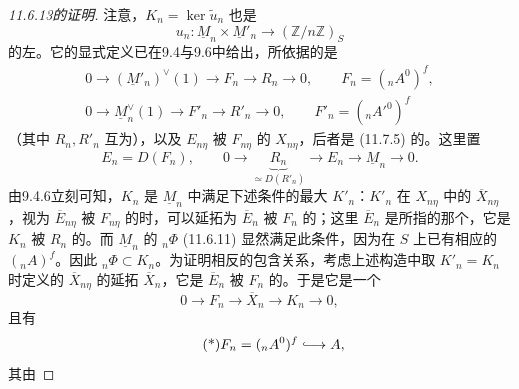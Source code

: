 \begin{proof}[11.6.13的证明]
注意，$K_n=\ker\widetilde u_n$ 也是
\[
 u_n:\underline M_n\times\underline M'_n\longrightarrow(\mathbb Z/n\mathbb Z)_S
\]
的左。它的显式定义已在9.4与9.6中给出，所依据的是
\begin{equation}\tag{11.6.14}
 \begin{gathered}
 0\longrightarrow(\underline M'_n)^\vee(1)\longrightarrow F_n
 \longrightarrow R_n\longrightarrow0,\qquad F_n=({}_nA^0)^f,\\
 0\longrightarrow\underline M_n^\vee(1)\longrightarrow F'_n
 \longrightarrow R'_n\longrightarrow0,\qquad F'_n=({}_nA'^0)^f
 \end{gathered}
\end{equation}
（其中 $R_n,R'_n$ 互为），以及 $E_{n\eta}$ 被 $F_{n\eta}$ 的 $X_{n\eta}$，后者是 (11.7.5) 的。这里置
\begin{equation}\tag{11.6.15}
 E_n=D(F_n),\qquad
 0\longrightarrow\underbrace{R_n}_{\simeq D(R'_n)}\longrightarrow E_n
 \longrightarrow\underline M_n\longrightarrow0.
\end{equation}
由9.4.6立刻可知，$K_n$ 是 $\underline M_n$ 中满足下述条件的最大 $K'_n$：$K'_n$ 在 $X_{n\eta}$ 中的 $\overline X_{n\eta}$，视为 $\overline E_{n\eta}$ 被 $F_{n\eta}$ 的时，可以延拓为 $\overline E_n$ 被 $F_n$ 的；这里 $\overline E_n$ 是所指的那个，它是 $K_n$ 被 $R_n$ 的。而 $\underline M_n$ 的 ${}_n\Phi$ (11.6.11) 显然满足此条件，因为在 $S$ 上已有相应的 $({}_nA)^f$。因此 ${}_n\Phi\subset K_n$。为证明相反的包含关系，考虑上述构造中取 $K'_n=K_n$ 时定义的 $\overline X_{n\eta}$ 的延拓
$\overline X_n$，它是 $\overline E_n$ 被 $F_n$ 的。于是它是一个
\[
 0\longrightarrow F_n\longrightarrow\overline X_n\longrightarrow K_n\longrightarrow0,
\]
且有
\begin{equation}\tag{*}
 F_n=({}_nA^0)^f\lhook\joinrel\longrightarrow A,
\end{equation}
其由

\end{proof}
